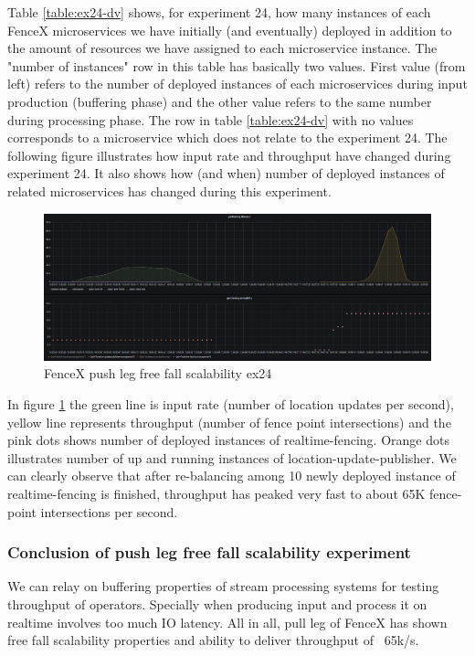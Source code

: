 \documentclass[a4]{report}
\begin{document}
    Table \ref{table:ex24-dv} shows, for experiment 24, how many instances of each FenceX microservices we have
    initially (and eventually) deployed in addition to the amount of resources we have assigned to each microservice
    instance.
    The "number of instances" row in this table has basically two values.
    First value (from left) refers to the number of deployed instances of each microservices during input production
    (buffering phase) and the other value refers to the same number during processing phase.
    The row in table \ref{table:ex24-dv} with no values corresponds to a microservice which does not relate to the
    experiment 24.
    The following figure illustrates how input rate and throughput have changed during experiment 24.
    It also shows how (and when) number of deployed instances of related microservices has changed during this
    experiment.

    \begin{figure}
        \centering
        \caption{FenceX push leg free fall scalability ex24}
        \label{fig:ex24}
        \includegraphics[width=\textwidth, height=0.3\textheight]{images/evaluation/ex24-benchmarking-ongoing-1per2sec.png}
    \end{figure}

    \clearpage

    In figure \ref{fig:ex24} the green line is input rate (number of location updates per second),
    yellow line represents throughput (number of fence point intersections) and the pink dots shows number of
    deployed instances of realtime-fencing.
    Orange dots illustrates number of up and running instances of location-update-publisher.
    We can clearly observe that after re-balancing among 10 newly deployed instance of realtime-fencing is finished,
    throughput has peaked very fast to about 65K fence-point intersections per second.

    \subsubsection{Conclusion of push leg free fall scalability experiment}
    We can relay on buffering properties of stream processing systems for testing throughput of operators.
    Specially when producing input and process it on realtime involves too much IO latency.
    All in all, pull leg of FenceX has shown free fall scalability properties and ability to deliver throughput of
    ~65k/s.
\end{document}
